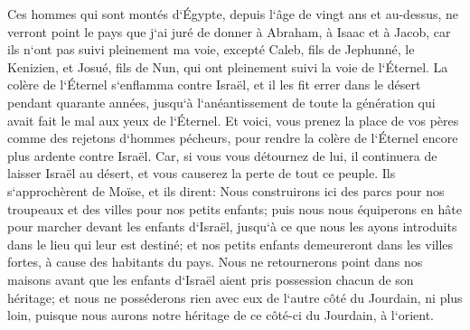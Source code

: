 \verse Ces hommes qui sont montés d`Égypte, depuis l`âge de vingt ans et au-dessus, ne verront point le pays que j`ai juré de donner à Abraham, à Isaac et à Jacob, car ils n`ont pas suivi pleinement ma voie, 
\verse excepté Caleb, fils de Jephunné, le Kenizien, et Josué, fils de Nun, qui ont pleinement suivi la voie de l`Éternel. 
\verse La colère de l`Éternel s`enflamma contre Israël, et il les fit errer dans le désert pendant quarante années, jusqu`à l`anéantissement de toute la génération qui avait fait le mal aux yeux de l`Éternel. 
\verse Et voici, vous prenez la place de vos pères comme des rejetons d`hommes pécheurs, pour rendre la colère de l`Éternel encore plus ardente contre Israël. 
\verse Car, si vous vous détournez de lui, il continuera de laisser Israël au désert, et vous causerez la perte de tout ce peuple. 
\verse Ils s`approchèrent de Moïse, et ils dirent: Nous construirons ici des parcs pour nos troupeaux et des villes pour nos petits enfants; 
\verse puis nous nous équiperons en hâte pour marcher devant les enfants d`Israël, jusqu`à ce que nous les ayons introduits dans le lieu qui leur est destiné; et nos petits enfants demeureront dans les villes fortes, à cause des habitants du pays. 
\verse Nous ne retournerons point dans nos maisons avant que les enfants d`Israël aient pris possession chacun de son héritage; 
\verse et nous ne posséderons rien avec eux de l`autre côté du Jourdain, ni plus loin, puisque nous aurons notre héritage de ce côté-ci du Jourdain, à l`orient. 
